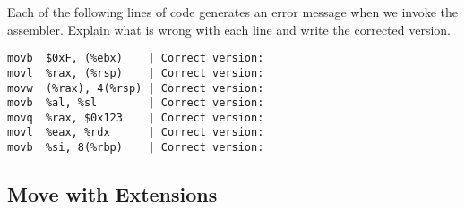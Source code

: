 \vspace{5pt}
%
Each of the following lines of code generates an error message when we invoke the assembler. 
Explain what is wrong with each line and write the corrected version.
%
\vspace{10pt}
%
\begin{lstlisting}[basicstyle=\ttfamily, frame=none]
movb  $0xF, (%ebx)    | Correct version: 
movl  %rax, (%rsp)    | Correct version:
movw  (%rax), 4(%rsp) | Correct version:
movb  %al, %sl        | Correct version:
movq  %rax, $0x123    | Correct version:
movl  %eax, %rdx      | Correct version:
movb  %si, 8(%rbp)    | Correct version:
\end{lstlisting}
%
\clearpage 
%
\subsection{Move with Extensions}
%
